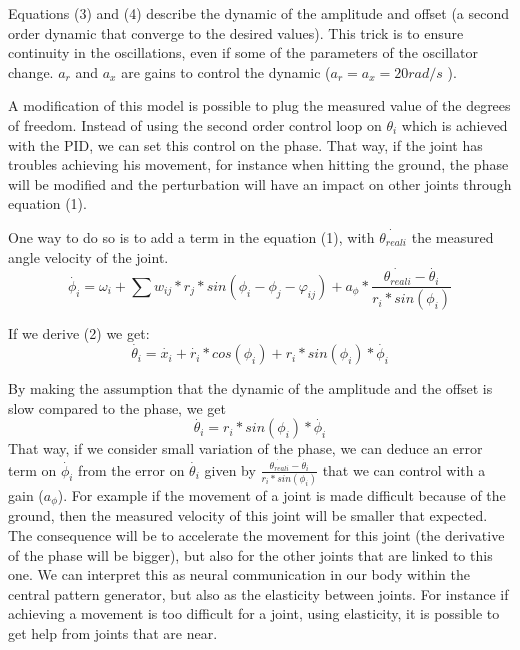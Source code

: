 Equations (3) and (4) describe the dynamic of the amplitude and offset (a second order dynamic that converge to the desired values). This trick is to ensure continuity in the oscillations, even if some of the parameters of the oscillator change. $a_r$ and $a_x$ are gains to control the dynamic ($a_r = a_x = 20 rad/s$  \cite{sproewitz}). 


A modification of this model is possible to plug the measured value of the degrees of freedom. Instead of using the second order control loop on $\theta_i$ which is achieved with the PID, we can set this control on the phase. That way, if the joint has troubles achieving his movement, for instance when hitting the ground, the phase will be modified and the perturbation will have an impact on other joints through equation (1).

One way to do so is to add a term in the equation (1), with $\dot{\theta_{reali}}$ the measured angle velocity of the joint. 
\begin{equation*}
    \dot{\phi_i} = \omega_i + \sum{w_{ij} * r_j * sin(\phi_i - \phi_j - \varphi_{ij}) + a_{\phi} * \frac {\dot{\theta_{reali}} - \dot{\theta_i}} {r_i * sin (\phi_i)}} \tag{1}
\end{equation*}

If we derive (2) we get: 
\begin{equation*}
    \dot{\theta_i} = \dot{x_i} + \dot{r_i} * cos(\phi_i) + r_i * sin(\phi_i) * \dot{\phi_i} \tag{2'}
\end{equation*}

By making the assumption that the dynamic of the amplitude and the offset is slow compared to the phase, we get
\begin{equation*}
    \dot{\theta_i} = r_i * sin(\phi_i) * \dot{\phi_i} \tag{2''}
\end{equation*}
That way, if we consider small variation of the phase, we can deduce an error term on $\dot{\phi_i}$ from the error on $\dot{\theta_i}$ given by $\frac {\dot{\theta_{reali}} - \dot{\theta_i}} {r_i * sin (\phi_i)}$ that we can control with a gain ($a_{\phi}$).
For example if the movement of a joint is made difficult because of the ground, then the measured velocity of this joint will be smaller that expected. The consequence will be to accelerate the movement for this joint (the derivative of the phase will be bigger), but also for the other joints that are linked to this one. We can interpret this as neural communication in our body within the central pattern generator, but also as the elasticity between joints. For instance if achieving a movement is too difficult for a joint, using elasticity, it is possible to get help from joints that are near. 


